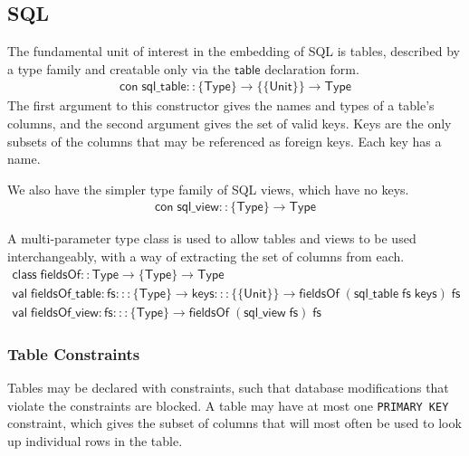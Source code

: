 \documentclass{article}
\newcommand{\mt}[1]{\mathsf{#1}}
\begin{document}
\subsection{SQL}

The fundamental unit of interest in the embedding of SQL is tables, described by a type family and creatable only via the $\mt{table}$ declaration form.
$$\begin{array}{l}
  \mt{con} \; \mt{sql\_table} :: \{\mt{Type}\} \to \{\{\mt{Unit}\}\} \to \mt{Type}
\end{array}$$
The first argument to this constructor gives the names and types of a table's columns, and the second argument gives the set of valid keys.  Keys are the only subsets of the columns that may be referenced as foreign keys.  Each key has a name.

We also have the simpler type family of SQL views, which have no keys.
$$\begin{array}{l}
  \mt{con} \; \mt{sql\_view} :: \{\mt{Type}\} \to \mt{Type}
\end{array}$$

A multi-parameter type class is used to allow tables and views to be used interchangeably, with a way of extracting the set of columns from each.
$$\begin{array}{l}
  \mt{class} \; \mt{fieldsOf} :: \mt{Type} \to \{\mt{Type}\} \to \mt{Type} \\
  \mt{val} \; \mt{fieldsOf\_table} : \mt{fs} ::: \{\mt{Type}\} \to \mt{keys} ::: \{\{\mt{Unit}\}\} \to \mt{fieldsOf} \; (\mt{sql\_table} \; \mt{fs} \; \mt{keys}) \; \mt{fs} \\
  \mt{val} \; \mt{fieldsOf\_view} : \mt{fs} ::: \{\mt{Type}\} \to \mt{fieldsOf} \; (\mt{sql\_view} \; \mt{fs}) \; \mt{fs}
\end{array}$$

\subsubsection{Table Constraints}

Tables may be declared with constraints, such that database modifications that violate the constraints are blocked.  A table may have at most one \texttt{PRIMARY KEY} constraint, which gives the subset of columns that will most often be used to look up individual rows in the table.
\end{document}
